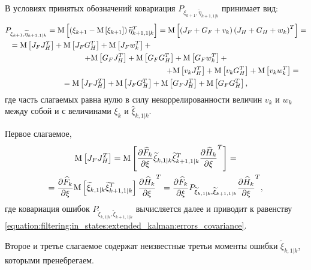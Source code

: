 В условиях принятых обозначений ковариация $P_{\xi_{k+1}, \widetilde{\eta}_{k+1,1|k}}$ принимает вид:
\begin{multline*}
    P_{\xi_{k+1}, \widetilde{\eta}_{k+1,1|k}}
        = \expectation{\centered{\xi_{k+1}} \widetilde{\eta}_{k+1,1|k}^T}
        = \expectation{\left ( J_F + G_F + v_k \right ) \left ( J_H + G_H + w_k \right )^T} = \\
    \shoveleft{ = \expectation{J_F J_H^T} + \expectation{J_F G_H^T} + \expectation{J_F w_k^T} + } \\
    + \expectation{G_F J_H^T} + \expectation{G_F G_H^T} + \expectation{G_F w_k^T} + \\
    \shoveright{+ \expectation{v_k J_H^T} + \expectation{v_k G_H^T} + \expectation{v_k w_k^T} = } \\
    = \expectation{J_F J_H^T} + \expectation{J_F G_H^T} + \expectation{G_F J_H^T} + \expectation{G_F G_H^T},
\end{multline*}
где часть слагаемых равна нулю в силу некоррелированности величин $v_k$ и $w_k$ между собой и с величинами $\xi_k$ и $\widehat{\xi}_{k,1|k}$.

Первое слагаемое,
\begin{multline*}
    \mathrm{M} \left [ J_F J_H^T \right ]
        = \mathrm{M} \left [  \frac{\partial \widehat{F}_k}{\partial \xi} \widetilde{\xi}_{k,1|k} \widetilde{\xi}_{k+1,1|k}^T \frac{\partial \widehat{H}_k}{\partial \xi}^T  \right ] = \\
    = \frac{\partial \widehat{F}_k}{\partial \xi} \mathrm{M} \left [ \widetilde{\xi}_{k,1|k} \widetilde{\xi}_{k+1,1|k}^T \right ] \frac{\partial \widehat{H}_k}{\partial \xi}^T
        = \frac{\partial \widehat{F}_k}{\partial \xi} P_{\widetilde{\xi}_{k,1|k}, \widetilde{\xi}_{k+1,1|k}} \frac{\partial \widehat{H}_k}{\partial \xi}^T ,
\end{multline*}
где ковариация ошибок $P_{\widetilde{\xi}_{k,1|k}, \widetilde{\xi}_{k+1,1|k}}$ вычисляется далее и приводит к равенству
\eqref{equation:filtering:in_states:extended_kalman:errors_covariance}.

Второе и третье слагаемое содержат неизвестные третьи моменты ошибки $\widetilde{\xi}_{k,1|k}$, которыми пренебрегаем.

